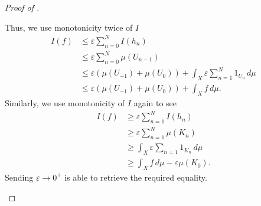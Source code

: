 \documentclass[../notes.tex]{subfiles}
\begin{document}
\begin{proof}[Proof of ]
\begin{enumerate}
		Thus, we use monotonicity twice of $I$ 
		\begin{align*}
			I(f) &\le \varepsilon\sum_{n=0}^NI(h_n) \\
			&\le \varepsilon\sum_{n=0}^N\mu(U_{n-1}) \\
			&\le \varepsilon(\mu(U_{-1})+\mu(U_0))+\int_X\varepsilon\sum_{n=1}^N1_{U_n}\,d\mu \\
			&\le \varepsilon(\mu(U_{-1})+\mu(U_0))+\int_Xf\,d\mu.
		\end{align*}
		Similarly, we use monotonicity of $I$ again to see
		\begin{align*}
			I(f) &\ge \varepsilon\sum_{n=1}^NI(h_n) \\
			&\ge \varepsilon\sum_{n=1}^N\mu(K_n) \\
			&\ge \int_X\varepsilon\sum_{n=1}1_{K_n}\,d\mu \\
			&\ge \int_Xf\,d\mu-\varepsilon\mu(K_0).
		\end{align*}
		Sending $\varepsilon\to0^+$ is able to retrieve the required equality.
		\qedhere
	\end{enumerate}
\end{proof}
\end{document}
